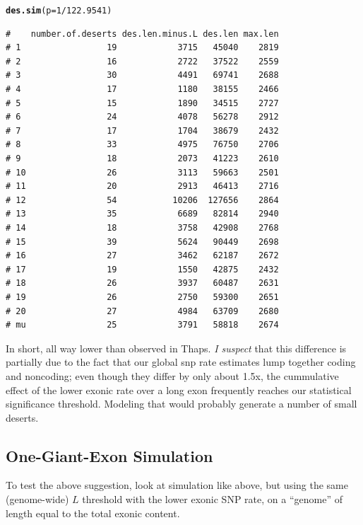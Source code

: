 \documentclass{article}\usepackage[]{graphicx}\usepackage[]{color}
\makeatletter
\newcommand{\hlnum}[1]{\textcolor[rgb]{0.686,0.059,0.569}{#1}}%
\newcommand{\hlopt}[1]{\textcolor[rgb]{0,0,0}{#1}}%
\newcommand{\hlstd}[1]{\textcolor[rgb]{0.345,0.345,0.345}{#1}}%
\newcommand{\hlkwc}[1]{\textcolor[rgb]{0.333,0.667,0.333}{#1}}%
\newcommand{\hlkwd}[1]{\textcolor[rgb]{0.737,0.353,0.396}{\textbf{#1}}}%
\newenvironment{kframe}{%
 \def\at@end@of@kframe{}%
 \ifinner\ifhmode%
  \def\at@end@of@kframe{\end{minipage}}%
  \begin{minipage}{\columnwidth}%
 \fi\fi%
 \def\FrameCommand##1{\hskip\@totalleftmargin \hskip-\fboxsep
 \colorbox{shadecolor}{##1}\hskip-\fboxsep
     \hskip-\linewidth \hskip-\@totalleftmargin \hskip\columnwidth}%
 \MakeFramed {\advance\hsize-\width
   \@totalleftmargin\z@ \linewidth\hsize
   \@setminipage}}%
 {\par\unskip\endMakeFramed%
 \at@end@of@kframe}
\newenvironment{knitrout}{}{} %
\makeatother
\begin{document}
\begin{knitrout}\footnotesize
{}\color{fgcolor}\begin{kframe}
\begin{alltt}
\hlkwd{des.sim}\hlstd{(}\hlkwc{p}\hlstd{=}\hlnum{1}\hlopt{/}\hlnum{122.9541}\hlstd{)}
\end{alltt}
\begin{verbatim}
#    number.of.deserts des.len.minus.L des.len max.len
# 1                 19            3715   45040    2819
# 2                 16            2722   37522    2559
# 3                 30            4491   69741    2688
# 4                 17            1180   38155    2466
# 5                 15            1890   34515    2727
# 6                 24            4078   56278    2912
# 7                 17            1704   38679    2432
# 8                 33            4975   76750    2706
# 9                 18            2073   41223    2610
# 10                26            3113   59663    2501
# 11                20            2913   46413    2716
# 12                54           10206  127656    2864
# 13                35            6689   82814    2940
# 14                18            3758   42908    2768
# 15                39            5624   90449    2698
# 16                27            3462   62187    2672
# 17                19            1550   42875    2432
# 18                26            3937   60487    2631
# 19                26            2750   59300    2651
# 20                27            4984   63709    2680
# mu                25            3791   58818    2674
\end{verbatim}
\end{kframe}
\end{knitrout}

In short, all way lower than observed in Thaps. \emph{I suspect} that this difference is partially due to the fact that our global snp rate estimates lump together coding and noncoding; even though they differ by only about 1.5x, the cummulative effect of the lower exonic rate over a long exon frequently reaches our statistical significance threshold.  Modeling that would probably generate a number of small deserts.  

\subsection{One-Giant-Exon Simulation}
\label{sec:giant-exon}
To test the above suggestion, look at simulation like above, but using the same (genome-wide) $L$ threshold with the lower exonic SNP rate, on a ``genome'' of length equal to the total exonic content.
\end{document}
